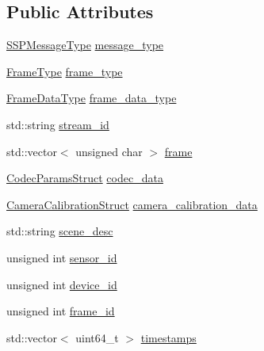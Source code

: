 \subsection*{Public Attributes}
\begin{DoxyCompactItemize}
\item 
\hyperlink{namespacemoetsi_1_1ssp_a8948545ffe48a5b3507fd10a1e56d546}{S\+S\+P\+Message\+Type} \hyperlink{structmoetsi_1_1ssp_1_1FrameStruct_a6c6ff38e4cbbf4e3af7cdcb6192e8ba8}{message\+\_\+type}
\item 
\hyperlink{namespacemoetsi_1_1ssp_a46efdfa2cd5a28ead465dcc8006b5a87}{Frame\+Type} \hyperlink{structmoetsi_1_1ssp_1_1FrameStruct_ac7fe0bfa84d7492827728c49544fc0a2}{frame\+\_\+type}
\item 
\hyperlink{namespacemoetsi_1_1ssp_aa9b059f0bc7a91855545ee887f2d56c4}{Frame\+Data\+Type} \hyperlink{structmoetsi_1_1ssp_1_1FrameStruct_a281ef582bcbb8b6b3d0f0eb3efd615c6}{frame\+\_\+data\+\_\+type}
\item 
std\+::string \hyperlink{structmoetsi_1_1ssp_1_1FrameStruct_a14a7976abfb26a9ca42e17555f8b1a8c}{stream\+\_\+id}
\item 
std\+::vector$<$ unsigned char $>$ \hyperlink{structmoetsi_1_1ssp_1_1FrameStruct_a7556ce8749c65cd5b22ea9c7a4c17619}{frame}
\item 
\hyperlink{structmoetsi_1_1ssp_1_1CodecParamsStruct}{Codec\+Params\+Struct} \hyperlink{structmoetsi_1_1ssp_1_1FrameStruct_a84ed01cb3227bcece29c43ba8ec322ee}{codec\+\_\+data}
\item 
\hyperlink{structmoetsi_1_1ssp_1_1CameraCalibrationStruct}{Camera\+Calibration\+Struct} \hyperlink{structmoetsi_1_1ssp_1_1FrameStruct_acbdc93c52c66264ed3f4c06a088c955d}{camera\+\_\+calibration\+\_\+data}
\item 
std\+::string \hyperlink{structmoetsi_1_1ssp_1_1FrameStruct_a7e717ab7290ddbb430c3c5a8858ddac6}{scene\+\_\+desc}
\item 
unsigned int \hyperlink{structmoetsi_1_1ssp_1_1FrameStruct_ae585f1be534924a69c8617b2f5f83568}{sensor\+\_\+id}
\item 
unsigned int \hyperlink{structmoetsi_1_1ssp_1_1FrameStruct_af3b1ea702009be5df748af30a159a38a}{device\+\_\+id}
\item 
unsigned int \hyperlink{structmoetsi_1_1ssp_1_1FrameStruct_aebc84f95b5024225412d92a56ddf24ad}{frame\+\_\+id}
\item 
std\+::vector$<$ uint64\+\_\+t $>$ \hyperlink{structmoetsi_1_1ssp_1_1FrameStruct_aa445729218d4963e527377d760ac8015}{timestamps}
\end{DoxyCompactItemize}


